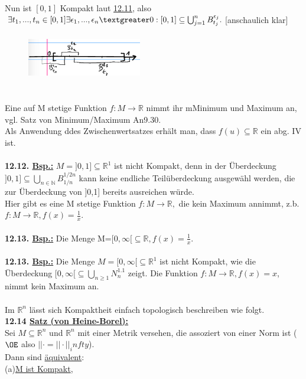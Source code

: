 \documentclass[]{scrartcl}
\begin{document}
	Nun ist $[0,1]$ Kompakt laut \ul{12.11}, also $\exists t_1,...,t_n\in[0,1]\exists \epsilon_1,...,\epsilon_n\textgreater 0:[0,1]\subseteq\bigcup_{j=1}^nB_{t_j}^{\epsilon_j}.$[anschaulich klar]
	\begin{figure}[h]  
		\includegraphics[width=5cm,height=2cm]{bsp kap 12.11}
	\end{figure}\\
	Eine auf M stetige Funktion $f:M\rightarrow\mathbb{R}$ nimmt ihr mMinimum und Maximum an, vgl. Satz von Minimum/Maximum An9.30.\\
	Als Anwendung ddes Zwischenwertsatzes erhält man, dass $f(u)\subseteq\mathbb{R}$ ein abg. IV ist.\\
	\\
	\textbf{12.12. \underline{Bsp.:}} $M=]0,1] \subseteq \mathbb{R}^1$ ist nicht Kompakt, denn in der Überdeckung $]0,1] \subseteq \bigcup_{n\in\mathbb{N}}B_{1/n}^{1/2n}$ kann keine endliche Teilüberdeckung ausgewähl werden, die zur Überdeckung von ]0,1] bereits ausreichen würde.\\
	Hier gibt es eine M stetige Funktion $f:M\rightarrow\mathbb{R},$ die kein Maximum annimmt, z.b. $f:M\rightarrow\mathbb{R}, f(x)=\frac{1}{x}$.\\
	\\
	\textbf{12.13. \underline{Bsp.:}} Die Menge M=$[0,\infty[\subseteq\mathbb{R}, f(x)=\frac{1}{x}$.\\
	\\
	\textbf{12.13. \underline{Bsp.:}} Die Menge $M=[0,\infty[\subseteq\mathbb{R}^1$ ist nicht Kompakt, wie die Überdeckung $[0,\infty[\subseteq \bigcup_{n\geq 1}N_n^{1.1}$ zeigt. Die Funktion $f:M\rightarrow\mathbb{R}, f(x)=x$, nimmt kein Maximum an.\\
	\\
	Im $\mathbb{R}^n$ lässt sich Kompaktheit einfach topologisch beschreiben wie folgt.\\
	\textbf{12.14 \ul{Satz (von Heine-Borel):}}\\
	Sei \ul{$M\subseteq\mathbb{R}^n$} und $\mathbb{R}^n$ mit einer Metrik versehen, die assoziert von einer Norm ist ($\OE$ also $||\cdot=||\cdot||_infty$).\\
	Dann sind \ul{äquivalent}: \\
	(a)\ul{M ist Kompakt},\\
\end{document}
